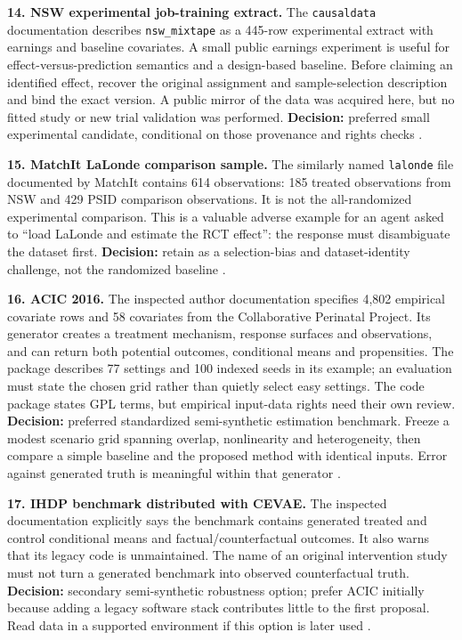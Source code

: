 \textbf{14. NSW experimental job-training extract.} The
\texttt{causaldata} documentation describes \texttt{nsw\_mixtape} as a
445-row experimental extract with earnings and baseline covariates. A
small public earnings experiment is useful for effect-versus-prediction
semantics and a design-based baseline. Before claiming an identified
effect, recover the original assignment and sample-selection description
and bind the exact version. A public mirror of the data was acquired
here, but no fitted study or new trial validation was performed.
\textbf{Decision:} preferred small experimental candidate, conditional
on those provenance and rights checks \citep{pd15_nsw_docs}.

\textbf{15. MatchIt LaLonde comparison sample.} The similarly named
\texttt{lalonde} file documented by MatchIt contains 614 observations:
185 treated observations from NSW and 429 PSID comparison observations.
It is not the all-randomized experimental comparison. This is a valuable
adverse example for an agent asked to ``load LaLonde and estimate the
RCT effect'': the response must disambiguate the dataset first.
\textbf{Decision:} retain as a selection-bias and dataset-identity
challenge, not the randomized baseline \citep{pd15_lalonde_pinned}.

\textbf{16. ACIC 2016.} The inspected author documentation specifies
4,802 empirical covariate rows and 58 covariates from the Collaborative
Perinatal Project. Its generator creates a treatment mechanism, response
surfaces and observations, and can return both potential outcomes,
conditional means and propensities. The package describes 77 settings
and 100 indexed seeds in its example; an evaluation must state the
chosen grid rather than quietly select easy settings. The code package
states GPL terms, but empirical input-data rights need their own review.
\textbf{Decision:} preferred standardized semi-synthetic estimation
benchmark. Freeze a modest scenario grid spanning overlap, nonlinearity
and heterogeneity, then compare a simple baseline and the proposed
method with identical inputs. Error against generated truth is
meaningful within that generator \citep{pd15_acic_pinned}.

\textbf{17. IHDP benchmark distributed with CEVAE.} The inspected
documentation explicitly says the benchmark contains generated treated
and control conditional means and factual/counterfactual outcomes. It
also warns that its legacy code is unmaintained. The name of an original
intervention study must not turn a generated benchmark into observed
counterfactual truth. \textbf{Decision:} secondary semi-synthetic
robustness option; prefer ACIC initially because adding a legacy
software stack contributes little to the first proposal. Read data in a
supported environment if this option is later used
\citep{pd15_cevae_pinned}.

